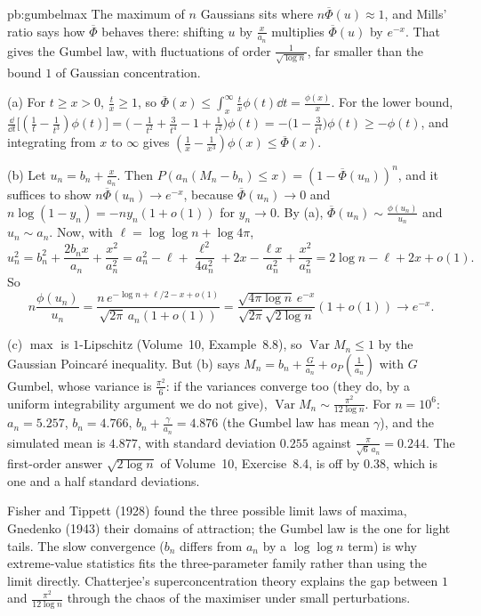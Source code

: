 \begin{solution}{pb:gumbelmax}
\idea The maximum of $n$ Gaussians sits where $n\overline\Phi(u)\approx1$, and Mills' ratio says how $\overline\Phi$ behaves there: shifting $u$ by $\frac x{a_n}$ multiplies
$\overline\Phi(u)$ by $e^{-x}$. That gives the Gumbel law, with fluctuations of order $\frac1{\sqrt{\log n}}$, far smaller than the bound $1$ of Gaussian concentration.

\writeup (a) For $t\ge x>0$, $\frac tx\ge1$, so $\overline\Phi(x)\le\int_x^\infty\frac tx\phi(t)\dd t=\frac{\phi(x)}x$. For the lower bound,
$\frac{\dd}{\dd t}\bigl[(\frac1t-\frac1{t^3})\phi(t)\bigr]=\bigl(-\frac1{t^2}+\frac3{t^4}-1+\frac1{t^2}\bigr)\phi(t)=-\bigl(1-\frac3{t^4}\bigr)\phi(t)\ge-\phi(t)$, and integrating from $x$
to $\infty$ gives $(\frac1x-\frac1{x^3})\phi(x)\le\overline\Phi(x)$.

(b) Let $u_n=b_n+\frac x{a_n}$. Then $P(a_n(M_n-b_n)\le x)=(1-\overline\Phi(u_n))^n$, and it suffices to show $n\overline\Phi(u_n)\to e^{-x}$, because $\overline\Phi(u_n)\to0$ and
$n\log(1-y_n)=-ny_n(1+o(1))$ for $y_n\to0$. By (a), $\overline\Phi(u_n)\sim\frac{\phi(u_n)}{u_n}$ and $u_n\sim a_n$. Now, with $\ell=\log\log n+\log4\pi$,
\[
u_n^2=b_n^2+\frac{2b_nx}{a_n}+\frac{x^2}{a_n^2}=a_n^2-\ell+\frac{\ell^2}{4a_n^2}+2x-\frac{\ell x}{a_n^2}+\frac{x^2}{a_n^2}=2\log n-\ell+2x+o(1).
\]
So
\[
n\frac{\phi(u_n)}{u_n}=\frac{n\,e^{-\log n+\ell/2-x+o(1)}}{\sqrt{2\pi}\,a_n(1+o(1))}=\frac{\sqrt{4\pi\log n}\,e^{-x}}{\sqrt{2\pi}\sqrt{2\log n}}(1+o(1))\to e^{-x}.
\]

(c) $\max$ is $1$-Lipschitz (Volume~10, Example~8.8), so $\operatorname{Var}M_n\le1$ by the Gaussian Poincar\'e inequality. But (b) says $M_n=b_n+\frac{G}{a_n}+o_P(\frac1{a_n})$ with $G$
Gumbel, whose variance is $\frac{\pi^2}6$: if the variances converge too (they do, by a uniform integrability argument we do not give), $\operatorname{Var}M_n\sim\frac{\pi^2}{12\log n}$. For
$n=10^6$: $a_n=5.257$, $b_n=4.766$, $b_n+\frac\gamma{a_n}=4.876$ (the Gumbel law has mean $\gamma$), and the simulated mean is $4.877$, with standard deviation $0.255$
against $\frac\pi{\sqrt6\,a_n}=0.244$. The first-order answer $\sqrt{2\log n}$ of Volume~10, Exercise~8.4, is off by $0.38$, which is one and a half standard deviations.

\leads Fisher and Tippett (1928) found the three possible limit laws of maxima, Gnedenko (1943) their domains of attraction; the Gumbel law is the one for light tails. The slow
convergence ($b_n$ differs from $a_n$ by a $\log\log n$ term) is why extreme-value statistics fits the three-parameter family rather than using the limit directly. Chatterjee's
superconcentration theory explains the gap between $1$ and $\frac{\pi^2}{12\log n}$ through the chaos of the maximiser under small perturbations.
\end{solution}

